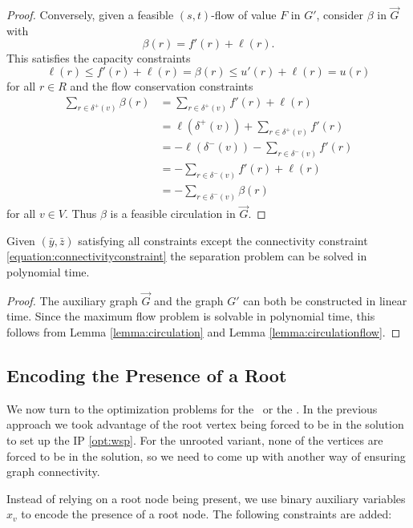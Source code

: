 \begin{proof}
	Conversely, given a feasible $(s, t)$-flow of value $F$ in $G'$, consider $\beta$ in $\overrightarrow{G}$ with 
	$$\beta(r) = f'(r) + \ell(r).$$
	This satisfies the capacity constraints
	$$\ell(r) \leq f'(r) + \ell(r) = \beta(r) \leq u'(r) + \ell(r) = u(r)$$
	for all $r \in R$ and the flow conservation constraints
	\begin{align*}
		\sum_{r \in \delta^+(v)} \beta(r) &= \sum_{r \in \delta^+(v)} f'(r) + \ell(r)\\
		&= \ell(\delta^+(v)) + \sum_{r \in \delta^+(v)} f'(r)\\
		&= - \ell(\delta^-(v)) - \sum_{r \in \delta^-(v)} f'(r)\\
		&= - \sum_{r \in \delta^-(v)} f'(r) + \ell(r)\\
		&= - \sum_{r \in \delta^-(v)} \beta(r)
	\end{align*}
	for all $v \in V$. Thus $\beta$ is a feasible circulation in $\overrightarrow{G}$.
\end{proof}

\begin{corollary}
	\label{corollary:separation}
	Given $(\bar{y}, \bar{z})$ satisfying all constraints except the connectivity constraint \eqref{equation:connectivityconstraint} the separation problem can be solved in polynomial time. 
\end{corollary}
\begin{proof}
	The auxiliary graph $\overrightarrow{G}$ and the graph $G'$ can both be constructed in linear time.	Since the maximum flow problem is solvable in polynomial time, this follows from Lemma \ref{lemma:circulation} and Lemma \ref{lemma:circulationflow}.
\end{proof}


\subsection{Encoding the Presence of a Root}
\label{sec:integer:wsp}

We now turn to the optimization problems for the \WSP\ or the \WISP. In the previous approach we took advantage of the root vertex being forced to be in the solution to set up the IP \eqref{opt:wsp}. For the unrooted variant, none of the vertices are forced to be in the solution, so we need to come up with another way of ensuring graph connectivity.\medskip

Instead of relying on a root node being present, we use binary auxiliary variables $x_v$ to encode the presence of a root node. The following constraints are added:

